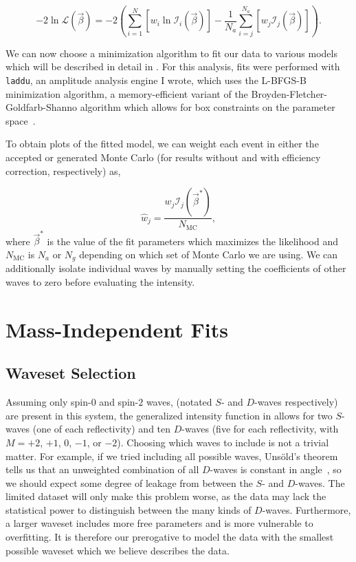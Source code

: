 \begin{equation}
  -2\ln\mathcal{L}(\vec{\beta}) = -2\left(\sum_{i=1}^N\left[w_i\ln\mathcal{I}_i(\vec{\beta})\right] - \frac{1}{N_a} \sum_{i=j}^{N_a}\left[w_j\mathcal{I}_j(\vec{\beta})\right]\right).
\end{equation}

We can now choose a minimization algorithm to fit our data to various models which will be described in detail in . For this analysis, fits were performed with \texttt{laddu}, an amplitude analysis engine I wrote, which uses the L-BFGS-B minimization algorithm, a memory-efficient variant of the Broyden-Fletcher-Goldfarb-Shanno algorithm which allows for box constraints on the parameter space~\cite{Byrd1995}.

To obtain plots of the fitted model, we can weight each event in either the accepted or generated Monte Carlo (for results without and with efficiency correction, respectively) as,

\begin{equation}
  \hat{w}_j = \frac{w_j \mathcal{I}_j(\vec{\beta}^*)}{N_\text{MC}},
\end{equation}
where $\vec{\beta}^*$ is the value of the fit parameters which maximizes the likelihood and $N_\text{MC}$ is $N_a$ or $N_g$ depending on which set of Monte Carlo we are using. We can additionally isolate individual waves by manually setting the coefficients of other waves to zero before evaluating the intensity.

\section{Mass-Independent Fits}\label{sec:mass-independent-fits}

\subsection{Waveset Selection}

Assuming only spin-$0$ and spin-$2$ waves, (notated $S$- and $D$-waves respectively) are present in this system, the generalized intensity function in  allows for two $S$-waves (one of each reflectivity) and ten $D$-waves (five for each reflectivity, with $M=+2$, $+1$, $0$, $-1$, or $-2$). Choosing which waves to include is not a trivial matter. For example, if we tried including all possible waves, Uns\"old's theorem tells us that an unweighted combination of all $D$-waves is constant in angle~\cite{Unsld1927}, so we should expect some degree of leakage from between the $S$- and $D$-waves. The limited dataset will only make this problem worse, as the data may lack the statistical power to distinguish between the many kinds of $D$-waves. Furthermore, a larger waveset includes more free parameters and is more vulnerable to overfitting. It is therefore our prerogative to model the data with the smallest possible waveset which we believe describes the data.

